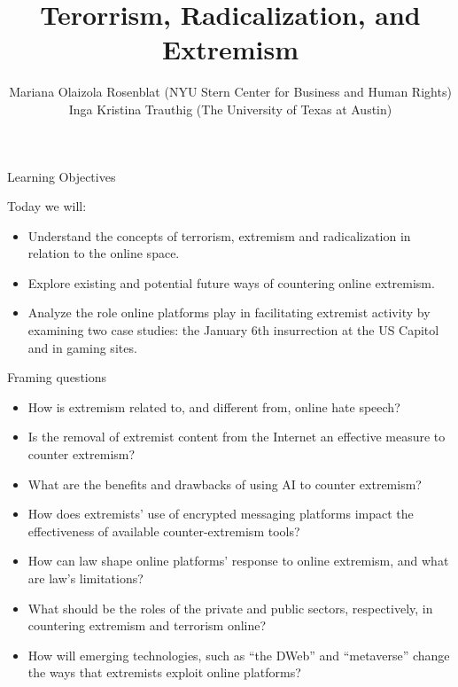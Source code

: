 \documentclass[nobackground,dvipsnames,table]{beamer}
\title[Terorrism, Radicalization, and Extremism]{Terorrism, Radicalization, and Extremism}
\author[]{\scriptsize{Mariana Olaizola Rosenblat (NYU Stern Center for Business and Human Rights)
\\ Inga Kristina Trauthig (The University of Texas at Austin)}}
\date[]{}
\begin{document}

\begin{frame}
	\titlepage
\end{frame}

\begin{frame}{Learning Objectives}

Today we will:
\begin{itemize}
    \item Understand the concepts of terrorism, extremism and radicalization in relation to the online space.
    \item Explore existing and potential future ways of countering online extremism.
    \item Analyze the role online platforms play in facilitating extremist activity by examining two case studies: the January 6th insurrection at the US Capitol and in gaming sites.
\end{itemize}
\end{frame}

\begin{frame}{Framing questions}
\small{
\begin{itemize}
    \item How is extremism related to, and different from, online hate speech?
    \item Is the removal of extremist content from the Internet an effective measure to counter extremism?
    \item What are the benefits and drawbacks of using AI to counter extremism?
    \item How does extremists’ use of encrypted messaging platforms impact the effectiveness of available counter-extremism tools?
    \item How can law shape online platforms’ response to online extremism, and what are law’s limitations?  
    \item What should be the roles of the private and public sectors, respectively, in countering extremism and terrorism online?
    \item How will emerging technologies, such as “the DWeb” and “metaverse” change the ways that extremists exploit online platforms?
\end{itemize}
}
\end{frame}
\end{document}
